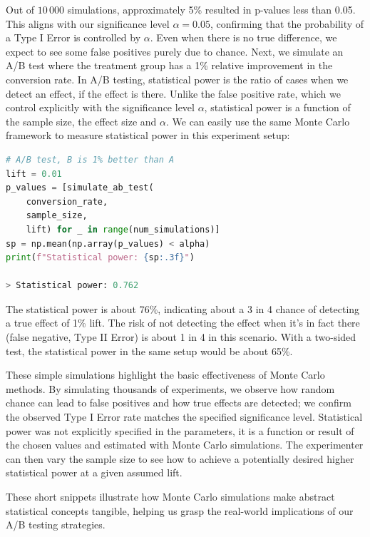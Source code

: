 \documentclass[final,5p,times,twocolumn,authoryear]{elsarticle}
\begin{document}
Out of $ 10\,000 $ simulations, approximately 5\% resulted in p-values less than 0.05. This aligns with our significance level $ \alpha = 0.05 $, confirming that the probability of a Type I Error is controlled by $ \alpha $. Even when there is no true difference, we expect to see some false positives purely due to chance. Next, we simulate an A/B test where the treatment group has a 1\% relative improvement in the conversion rate. In A/B testing, statistical power is the ratio of cases when we detect an effect, if the effect is there. Unlike the false positive rate, which we control explicitly with the significance level $ \alpha $, statistical power is a function of the sample size, the effect size and $ \alpha $. We can easily use the same Monte Carlo framework to measure statistical power in this experiment setup:

\begin{minipage}{\linewidth}
\begin{lstlisting}[language=Python, caption=A/B test statistical power computation.]
# A/B test, B is 1% better than A
lift = 0.01
p_values = [simulate_ab_test(
    conversion_rate,
    sample_size,
    lift) for _ in range(num_simulations)]
sp = np.mean(np.array(p_values) < alpha)
print(f"Statistical power: {sp:.3f}")

> Statistical power: 0.762
\end{lstlisting}
\end{minipage}

The statistical power is about 76\%, indicating about a 3 in 4 chance of detecting a true effect of 1\% lift. The risk of not detecting the effect when it's in fact there (false negative, Type II Error) is about 1 in 4 in this scenario. With a two-sided test, the statistical power in the same setup would be about 65\%.

These simple simulations highlight the basic effectiveness of Monte Carlo methods. By simulating thousands of experiments, we observe how random chance can lead to false positives and how true effects are detected; we confirm the observed Type I Error rate matches the specified significance level. Statistical power was not explicitly specified in the parameters, it is a function or result of the chosen values and estimated with Monte Carlo simulations. The experimenter can then vary the sample size to see how to achieve a potentially desired higher statistical power at a given assumed lift.

These short snippets illustrate how Monte Carlo simulations make abstract statistical concepts tangible, helping us grasp the real-world implications of our A/B testing strategies.
\end{document}
